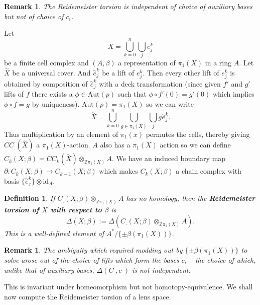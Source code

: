 \documentclass{article}
\newtheorem{definition}[theorem]{Definition}
\newtheorem{remark}[theorem]{Remark}
\begin{document}
\begin{remark}
The Reidemeister torsion is independent of choice of auxiliary bases but not of choice of $c_i$.
\end{remark}

\noindent Let \[X=\bigcup_{k=0}^n\bigcup_je_j^k\] be a finite cell complex and $(A,\beta)$ a representation of $\pi_1(X)$ in a ring $A$. Let $\overset{\sim}{X}$ be a universal cover. And $\overset{\sim}{e}_j^k$ be a lift of $e_j^k$. Then every other lift of $e_j^k$ is obtained by composition of $\overset{\sim}{e}_j^k$ with a deck transformation (since given $f'$ and $g'$ lifts of $f$ there exists a $\phi\in\text{Aut}(p)$ such that $\phi\circ f'(0)=g'(0)$ which implies $\phi\circ f=g$ by uniqueness). $\text{Aut}(p)=\pi_1(X)$ so we can write \[\overset{\sim}{X}=\bigcup_{k=0}^n\bigcup_{g\in\pi_1(X)}\bigcup_jg\overset{\sim}{e}_j^k.\] Thus multiplication by an element of $\pi_1(x)$ permutes the cells, thereby giving $CC_.(\overset{\sim}{X})$ a $\pi_1(X)$-action. $A$ also has a $\pi_1(X)$ action so we can define $C_k(X;\beta)=CC_k(\overset{\sim}{X})\otimes_{\mathbb{Z}\pi_1(X)} A$. We have an induced boundary map $\partial\colon C_k(X;\beta)\to C_{k-1}(X;\beta)$ which makes $C_k(X;\beta)$ a chain complex with basis $\{\overset{\sim}{e}_j^k\}\otimes\text{id}_A$.

\begin{definition}
If $C_.(X;\beta)\otimes_{\mathbb{Z}\pi_1(X)}A$ has no homology, then the \textbf{Reidemeister torsion of $X$ with respect to $\beta$} is \[\Delta(X;\beta):=\Delta(C_.(X;\beta)\otimes_{\mathbb{Z}\pi_1(X)}A).\] This is a well-defined element of $A^*/\{\pm\beta(\pi_1(X))\}$.
\end{definition}
\begin{remark}
The ambiguity which required modding out by $\{\pm\beta(\pi_1(X))\}$ to solve arose out of the choice of lifts which form the bases $c_i$ -- the choice of which, unlike that of auxiliary bases, $\Delta(C_.,c_.)$ is not independent.
\end{remark}

\noindent This is invariant under homeomorphism but not homotopy-equivalence. We shall now compute the Reidemeister torsion of a lens space.\\
\end{document}
